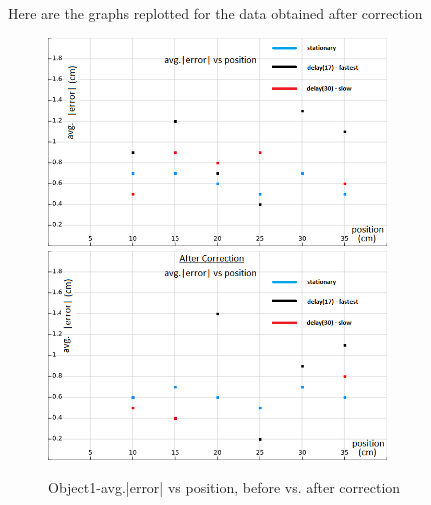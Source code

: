	\clearpage
Here are the graphs replotted for the data obtained after correction
	\begin{figure}[H]
		\vfill
		\centering
		\includegraphics[width=0.8\textwidth]{../Files/save12}\\
		
		\includegraphics[width=0.8\textwidth]{../Files/save11}
		\caption{Object1-avg.|error| vs position, before vs. after correction}  
	\end{figure}
